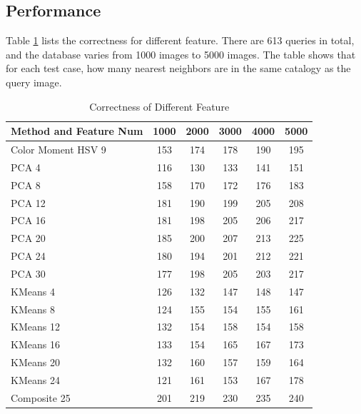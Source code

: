 \documentclass{acm_proc_article-sp}
\begin{document}
\subsection{Performance}
Table \ref{table:correctness} lists the correctness for different feature.
There are 613 queries in total, and the database varies from 1000 images
    to 5000 images.
The table shows that for each test case,
    how many nearest neighbors are in the same catalogy as
    the query image.
\begin{table} \centering 
\begin{tabular}{|p{2.1cm}|c|c|c|c|c|}
    \hline
    Method and Feature Num & 1000 & 2000 & 3000 & 4000 & 5000 \\ \hline
    Color Moment HSV 9 & 153 & 174 & 178 & 190 & 195 \\ \hline
    PCA 4 & 116 & 130 & 133 & 141 & 151 \\ \hline
    PCA 8 & 158 & 170 & 172 & 176 & 183 \\ \hline
    PCA 12 & 181 & 190 & 199 & 205 & 208 \\ \hline
    PCA 16 & 181 & 198 & 205 & 206 & 217 \\ \hline
    PCA 20 & 185 & 200 & 207 & 213 & 225 \\ \hline
    PCA 24 & 180 & 194 & 201 & 212 & 221 \\ \hline
    PCA 30 & 177 & 198 & 205 & 203 & 217 \\ \hline
    KMeans 4 & 126 & 132 & 147 & 148 & 147 \\ \hline
    KMeans 8 & 124 & 155 & 154 & 155 & 161 \\ \hline
    KMeans 12 & 132 & 154 & 158 & 154 & 158 \\ \hline
    KMeans 16 & 133 & 154 & 165 & 167 & 173 \\ \hline
    KMeans 20 & 132 & 160 & 157 & 159 & 164 \\ \hline
    KMeans 24 & 121 & 161 & 153 & 167 & 178 \\ \hline
    Composite 25 & 201 & 219 & 230 & 235 & 240 \\ \hline
\end{tabular} 
\caption{Correctness of Different Feature}
\label{table:correctness}
\end{table}
\end{document}
